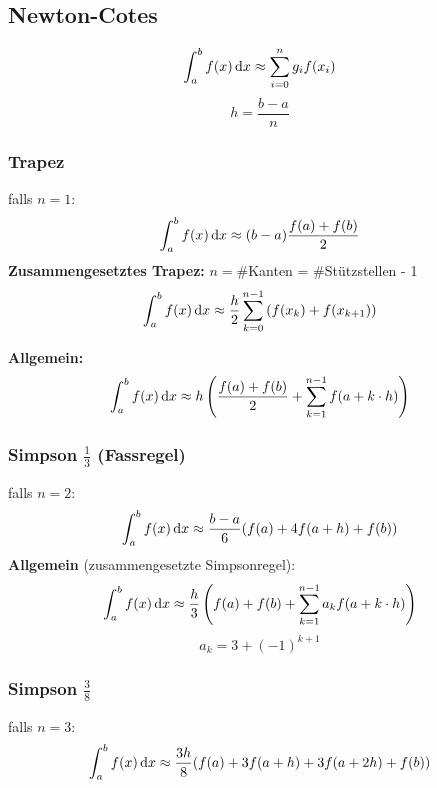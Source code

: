 \documentclass[german]{latex4ei/latex4ei_sheet}
\begin{document}
\begin{sectionbox}
\subsection{Newton-Cotes}
\begin{equation*}
	\int_a^b f(x) \diff x \approx \sum_{i = 0}^n g_i f(x_i)
\end{equation*}
\begin{equation*}
	h = \frac{b - a}{n}
\end{equation*}

\subsubsection{Trapez}
falls $n = 1$:
\begin{equation*}
	\int_a^b f(x) \diff x \approx (b - a) \frac{f(a) + f(b)}{2}
\end{equation*}
\textbf{Zusammengesetztes Trapez: } $n = $\#Kanten = \#Stützstellen - 1
\begin{equation*}
	\int_a^b f(x) \diff x \approx  \frac{h}{2} \sum\limits_{k = 0}^{n-1} \left( f(x_k) + f(x_{k+1})  \right)
\end{equation*}

\textbf{Allgemein:} 
\begin{equation*}
	\int_a^b f(x) \diff x \approx h \left( \frac{f(a) + f(b)}{2} + \sum_{k = 1}^{n - 1} f(a + k \cdot h) \right)
\end{equation*}
\end{sectionbox}

\begin{sectionbox}
\subsubsection{Simpson $\frac{1}{3}$ (Fassregel)}
falls $n = 2$:
\begin{equation*}
	\int_a^b f(x) \diff x \approx \frac{b - a}{6} (f(a) + 4 f(a + h) + f(b))
\end{equation*}
\textbf{Allgemein} (zusammengesetzte Simpsonregel):
\begin{equation*}
	\int_a^b f(x) \diff x \approx \frac{h}{3} \left( f(a) + f(b) + \sum_{k = 1}^{n - 1} a_k f(a + k \cdot h) \right)
\end{equation*}
\begin{equation*}
	a_k = 3 + (-1)^{k + 1}
\end{equation*}

\subsubsection{Simpson $\frac{3}{8}$}
falls $n = 3$:
\begin{equation*}
	\int_a^b f(x) \diff x \approx \frac{3h}{8} (f(a) + 3 f(a + h) + 3 f(a + 2h) + f(b))
\end{equation*}
\end{sectionbox}
\end{document}

